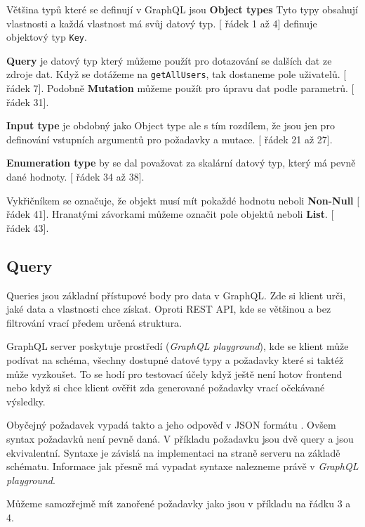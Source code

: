 Většina typů které se definují v GraphQL jsou \textbf{Object types} Tyto typy obsahují vlastnosti a každá vlastnost má svůj datový typ. [ řádek 1 až 4] definuje objektový typ \texttt{Key}.

\textbf{Query} je datový typ který můžeme použít pro dotazování se dalších dat ze zdroje dat. Když se dotážeme na \texttt{getAllUsers}, tak dostaneme pole uživatelů. [ řádek 7]. Podobně \textbf{Mutation} můžeme použít pro úpravu dat podle parametrů. [ řádek 31].

\textbf{Input type} je obdobný jako Object type ale s tím rozdílem, že jsou jen pro definování vstupních argumentů pro požadavky a mutace. [ řádek 21 až 27].

\textbf{Enumeration type} by se dal považovat za skalární datový typ, který má pevně dané hodnoty. [ řádek 34 až 38].

Vykřičníkem se označuje, že objekt musí mít pokaždé hodnotu neboli \textbf{Non-Null} [ řádek 41]. Hranatými závorkami můžeme označit pole objektů neboli \textbf{List}. [ řádek 43].

\subsection{Query}\label{sec:graphql:query}
Queries jsou základní přístupové body pro data v GraphQL. Zde si klient urči, jaké data a vlastnosti chce získat. Oproti REST API, kde se většinou a bez filtrování vrací předem určená struktura.

GraphQL server poskytuje prostředí (\textit{GraphQL playground}), kde se klient může podívat na schéma, všechny dostupné datové typy a požadavky které si taktéž může vyzkoušet. To se hodí pro testovací účely když ještě není hotov frontend nebo když si chce klient ověřit zda generované požadavky vrací očekávané výsledky.

Obyčejný požadavek vypadá takto  a jeho odpověď v JSON formátu .
Ovšem syntax požadavků není pevně daná. V příkladu požadavku jsou dvě query a jsou ekvivalentní. Syntaxe je závislá na implementaci na straně serveru na základě schématu. Informace jak přesně má vypadat syntaxe nalezneme právě v \textit{GraphQL playground}.

Můžeme samozřejmě mít zanořené požadavky jako jsou v příkladu  na řádku 3 a 4.

